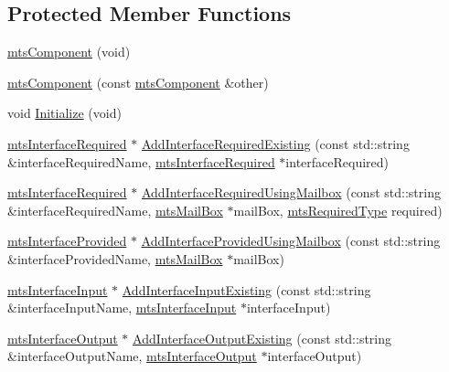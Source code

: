 \subsection*{Protected Member Functions}
\begin{DoxyCompactItemize}
\item 
\hyperlink{classmts_component_a1fae65e0de8abf2c69d56abaeb285d8a}{mts\-Component} (void)
\item 
\hyperlink{classmts_component_a6da874fdd59045ae4b0f6db8fa9daae8}{mts\-Component} (const \hyperlink{classmts_component}{mts\-Component} \&other)
\item 
void \hyperlink{classmts_component_ae2f9fa8cd2b8081e1c6311cda35e0ef4}{Initialize} (void)
\item 
\hyperlink{classmts_interface_required}{mts\-Interface\-Required} $\ast$ \hyperlink{classmts_component_a75f7bc556154f54e36952d588a770355}{Add\-Interface\-Required\-Existing} (const std\-::string \&interface\-Required\-Name, \hyperlink{classmts_interface_required}{mts\-Interface\-Required} $\ast$interface\-Required)
\item 
\hyperlink{classmts_interface_required}{mts\-Interface\-Required} $\ast$ \hyperlink{classmts_component_a0aaed1ea809e3c472576716f035c4478}{Add\-Interface\-Required\-Using\-Mailbox} (const std\-::string \&interface\-Required\-Name, \hyperlink{classmts_mail_box}{mts\-Mail\-Box} $\ast$mail\-Box, \hyperlink{mts_forward_declarations_8h_a9ef1ce54724afde7802db326ff8606f3}{mts\-Required\-Type} required)
\item 
\hyperlink{classmts_interface_provided}{mts\-Interface\-Provided} $\ast$ \hyperlink{classmts_component_ac0f8af0faab3ef1cc01e2faead1987c1}{Add\-Interface\-Provided\-Using\-Mailbox} (const std\-::string \&interface\-Provided\-Name, \hyperlink{classmts_mail_box}{mts\-Mail\-Box} $\ast$mail\-Box)
\item 
\hyperlink{classmts_interface_input}{mts\-Interface\-Input} $\ast$ \hyperlink{classmts_component_a5a475a2fe2b9d95273cfdab497462796}{Add\-Interface\-Input\-Existing} (const std\-::string \&interface\-Input\-Name, \hyperlink{classmts_interface_input}{mts\-Interface\-Input} $\ast$interface\-Input)
\item 
\hyperlink{classmts_interface_output}{mts\-Interface\-Output} $\ast$ \hyperlink{classmts_component_a79135dc4352611e134d668c92b381a90}{Add\-Interface\-Output\-Existing} (const std\-::string \&interface\-Output\-Name, \hyperlink{classmts_interface_output}{mts\-Interface\-Output} $\ast$interface\-Output)
\item 

\end{DoxyCompactItemize}
